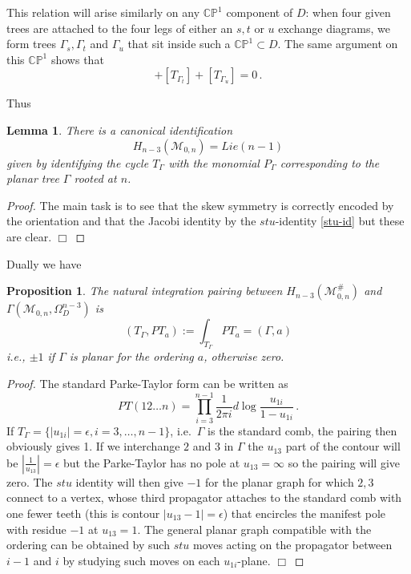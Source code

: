 \documentclass[11pt]{article}
\newcommand{\CP}{\mathbb{CP}}
\newcommand{\cM}{\mathcal{M}}
\newcommand{\1}{{\rm 1\hskip-0.25em I}}
\newtheorem{propn}{Proposition}[section]
\newtheorem{lemma}{Lemma}[section]
\begin{document}
 This relation will arise similarly on any $\CP^1$  component of $D$:  when four given trees are attached to the four legs of either an $s,t$ or $u$ exchange diagrams, we form trees $\Gamma_s, \Gamma_t$ and $\Gamma_u$  that sit inside such a $\CP^1 \subset D$.  The same argument on this $\CP^1$ shows that 
\begin{equation}
[T_{\Gamma_s}]+[T_{\Gamma_t}]+[T_{\Gamma_u}]=0\, .\label{stu-id}
\end{equation}

Thus
\begin{lemma}
There is a canonical identification 
\begin{equation}
 H_{n-3}(\cM_{0,n})= Lie(n-1)
\end{equation}
given by identifying the cycle $T_\Gamma$ with the monomial $P_\Gamma$ corresponding to the planar tree $\Gamma$ rooted at $n$.
\end{lemma}

\begin{proof}
The main task is to see that the skew symmetry is correctly encoded by the orientation and that the Jacobi identity by the $stu$-identity \eqref{stu-id} but these are clear. $\Box$
\end{proof}


\smallskip




Dually we have 
\begin{propn}\label{T-PT-pairing}
The natural integration pairing  between $H_{n-3}(\cM^\#_{0,n})$ and $\Gamma(\cM_{0,n},\Omega^{n-3}_D)$ is \begin{equation}
(T_\Gamma,PT_a):=\int_{T_\Gamma}PT_a =(\Gamma,a)
\end{equation}
i.e., $\pm 1$ if $\Gamma $ is planar for the ordering $a$, otherwise zero. \end{propn}

\begin{proof}
The standard Parke-Taylor form can be written as 
\begin{equation}
PT(12\ldots n)=\prod_{i=3}^{n-1} \frac{1}{2\pi i}d\log \frac{ u_{1i}}{1- u_{1i}}\, .\label{comb-PT}
\end{equation}
If $T_\Gamma=\{|u_{1i}|=\epsilon, i=3,\ldots ,n-1\}$, i.e.\ $\Gamma $ is the standard comb, the pairing then obviously gives  1. If  we interchange $2$ and $3$ in $\Gamma$ the $u_{13}$ part of the contour will be $|\frac1{u_{13}}|=\epsilon$ but the Parke-Taylor has no pole at $u_{13}=\infty$ so the pairing will give zero. The $stu$ identity will then give $- 1$ for the planar graph for which $2,3$ connect to a vertex, whose third propagator  attaches to the standard comb with one fewer teeth (this is contour $|u_{13}-1|=\epsilon$) that encircles the manifest pole with residue $-1$ at $u_{13}=1$.  The general planar graph compatible with the ordering can be obtained by such $stu$ moves acting on the propagator between $i-1$ and $i$ by studying such moves on each $u_{1i}$-plane. $\Box$
\end{proof}
\end{document}
